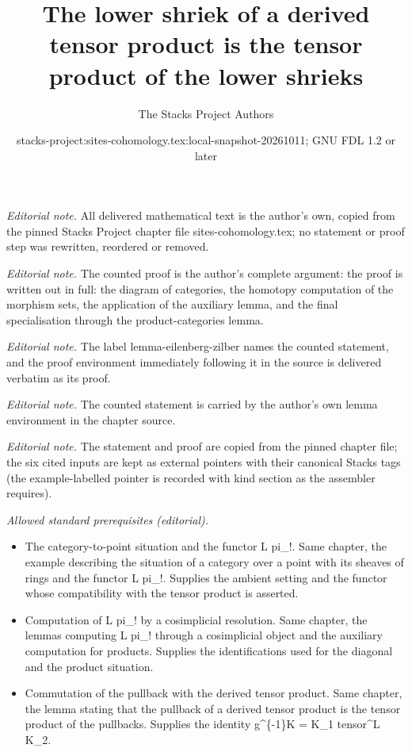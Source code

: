 \documentclass[10pt,a4paper]{amsart}
\title{The lower shriek of a derived tensor product is the tensor product of the lower shrieks}
\author{The Stacks Project Authors}
\date{stacks-project:sites-cohomology.tex:local-snapshot-20261011; GNU FDL 1.2 or later}
\theoremstyle{plain}
\theoremstyle{definition}
\theoremstyle{remark}
\numberwithin{equation}{subsection}
\begin{document}
\maketitle
\noindent\textit{Editorial note.} All delivered mathematical text is the author's own, copied from the pinned Stacks Project chapter file sites-cohomology.tex; no statement or proof step was rewritten, reordered or removed.\par\medskip
\noindent\textit{Editorial note.} The counted proof is the author's complete argument: the proof is written out in full: the diagram of categories, the homotopy computation of the morphism sets, the application of the auxiliary lemma, and the final specialisation through the product-categories lemma.\par\medskip
\noindent\textit{Editorial note.} The label lemma-eilenberg-zilber names the counted statement, and the proof environment immediately following it in the source is delivered verbatim as its proof.\par\medskip
\noindent\textit{Editorial note.} The counted statement is carried by the author's own lemma environment in the chapter source.\par\medskip
\noindent\textit{Editorial note.} The statement and proof are copied from the pinned chapter file; the six cited inputs are kept as external pointers with their canonical Stacks tags (the example-labelled pointer is recorded with kind section as the assembler requires).\par\medskip
\noindent\textit{Allowed standard prerequisites (editorial).}\begin{itemize}
\item The category-to-point situation and the functor L pi\_!. Same chapter, the example describing the situation of a category over a point with its sheaves of rings and the functor L pi\_!. Supplies the ambient setting and the functor whose compatibility with the tensor product is asserted.
\item Computation of L pi\_! by a cosimplicial resolution. Same chapter, the lemmas computing L pi\_! through a cosimplicial object and the auxiliary computation for products. Supplies the identifications used for the diagonal and the product situation.
\item Commutation of the pullback with the derived tensor product. Same chapter, the lemma stating that the pullback of a derived tensor product is the tensor product of the pullbacks. Supplies the identity g\textasciicircum{}\{-1\}K = K\_1 tensor\textasciicircum{}L K\_2.
\end{itemize}\medskip
\end{document}

